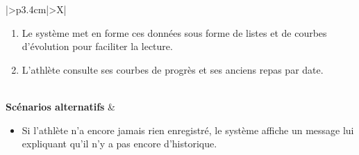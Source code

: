 ﻿\documentclass[a4paper,12pt]{report}
\begin{document}
\begin{table}[H]
\begin{tabularx}{\textwidth}{|>{\RaggedRight\arraybackslash}p{3.4cm}|>{\RaggedRight\arraybackslash}X|}
\begin{minipage}[t]{\linewidth}
\begin{enumerate}[label=\arabic*., leftmargin=*, topsep=0pt, itemsep=1pt]
\begin{itemize}[leftmargin=*, topsep=1pt, itemsep=1pt]
        \item L'évolution des mesures du corps (poids et mensurations).
    \end{itemize}
    \item Le système met en forme ces données sous forme de listes et de courbes d'évolution pour faciliter la lecture.
    \item L'athlète consulte ses courbes de progrès et ses anciens repas par date.
\end{enumerate}
\vspace{2pt}
\end{minipage} \\
\hline
\textbf{Scénarios alternatifs} &
\begin{minipage}[t]{\linewidth}
\vspace{2pt}
\begin{itemize}[leftmargin=*, topsep=0pt, itemsep=1pt]
    \item  Si l'athlète n'a encore jamais rien enregistré, le système affiche un message lui expliquant qu'il n'y a pas encore d'historique.
\end{itemize}
\vspace{2pt}
\end{minipage} \\
\hline
\end{tabularx}
\fussy
\end{table}
\end{document}
